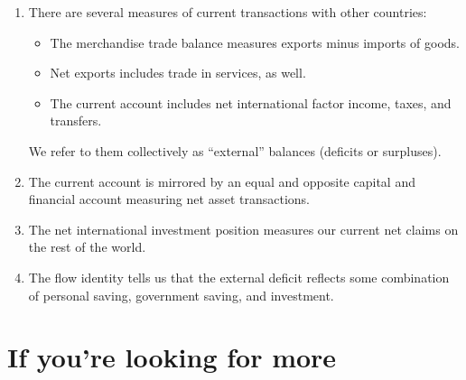 \begin{enumerate}
\item There are several measures of current transactions with other countries:
\begin{itemize}
\item The merchandise trade balance measures exports minus imports of goods. \item Net exports
includes trade in services, as well. \item The current account includes net international factor
income, taxes, and transfers.
\end{itemize}
We refer to them collectively as ``external'' balances (deficits or surpluses).

\item The current account is mirrored by an equal and opposite capital and financial account
measuring net asset transactions.

\item The net international investment position measures our current net claims on the rest of the world.

\item The flow identity tells us that the external deficit
reflects some combination of personal saving, government saving,
and investment.

\end{enumerate}


\begin{comment}
\section*{Review questions}

\begin{enumerate}

\item What if we write off debt?

\item Why no interest payments in (\ref{eq:niip})?

\end{enumerate}
\end{comment}

\section*{If you're looking for more}

